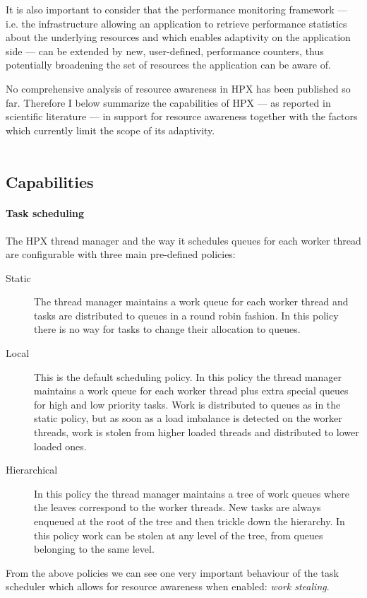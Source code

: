 It is also important to consider that the performance monitoring framework --- i.e. the infrastructure allowing an application to retrieve performance statistics about the underlying resources and which enables adaptivity on the application side --- can be extended by new, user-defined, performance counters, thus potentially broadening the set of resources the application can be aware of.

No comprehensive analysis of resource awareness in HPX has been published so far.
Therefore I below summarize the capabilities of HPX --- as reported in scientific literature --- in support for resource awareness together with the factors which currently limit the scope of its adaptivity.
~\\~

\subsection{Capabilities}
\paragraph{Task scheduling}
The HPX thread manager and the way it schedules queues for each worker thread are configurable with three main pre-defined policies\cite{heller2017hpx,amatya2014parallel}:
\begin{description}
	\item [Static] The thread manager maintains a work queue for each worker thread and tasks are distributed to queues in a round robin fashion. In this policy there is no way for tasks to change their allocation to queues.
	\item [Local] This is the default scheduling policy. In this policy the thread manager maintains a work queue for each worker thread plus extra special queues for high and low priority tasks. Work is distributed to queues as in the static policy, but as soon as a load imbalance is detected on the worker threads, work is stolen from higher loaded threads and distributed to lower loaded ones.
	\item [Hierarchical] In this policy the thread manager maintains a tree of work queues where the leaves correspond to the worker threads. New tasks are always enqueued at the root of the tree and then trickle down the hierarchy. In this policy work can be stolen at any level of the tree, from queues belonging to the same level.
\end{description}

From the above policies we can see one very important behaviour of the task scheduler which allows for resource awareness when enabled: \emph{work stealing}.

